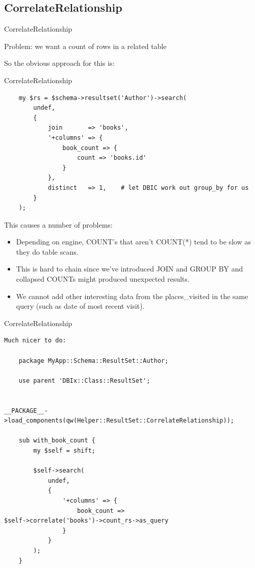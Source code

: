 \subsection{CorrelateRelationship}

\begin{frame}{CorrelateRelationship}

Problem: we want a count of rows in a related table

\end{frame}

So the obvious approach for this is:

\begin{frame}[fragile]{CorrelateRelationship}
\begin{lstlisting}
    my $rs = $schema->resultset('Author')->search(
        undef,
        {
            join       => 'books',
            '+columns' => {
                book_count => {
                    count => 'books.id'
                }
            },
            distinct   => 1,    # let DBIC work out group_by for us
        }
    );
\end{lstlisting}
\end{frame}
This causes a number of problems:

\begin{itemize}
\item Depending on engine, COUNT’s that aren’t COUNT(*) tend to be slow as
they do table scans.
\item This is hard to chain since we've introduced JOIN and GROUP BY and
collapsed COUNTs might produced unexpected results.
\item We cannot add other interesting data from the places\_visited in the same query (such as date of most recent visit).
\end{itemize}

\begin{frame}[fragile]{CorrelateRelationship}
\begin{lstlisting}
Much nicer to do:

    package MyApp::Schema::ResultSet::Author;

    use parent 'DBIx::Class::ResultSet';

   
__PACKAGE__->load_components(qw(Helper::ResultSet::CorrelateRelationship));

    sub with_book_count {
        my $self = shift;

        $self->search(
            undef,
            {
                '+columns' => {
                    book_count =>
$self->correlate('books')->count_rs->as_query
                }
            }
        );
    }
\end{lstlisting}
\end{frame}

